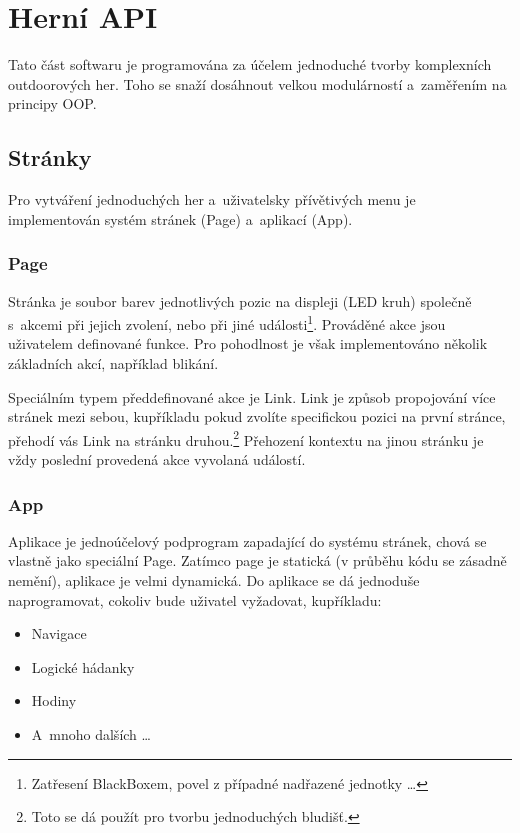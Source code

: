\chapter{Herní API}
Tato část softwaru je programována za účelem jednoduché tvorby komplexních outdoorových her.
Toho se snaží dosáhnout velkou modulárností a~zaměřením na principy OOP.

\section{Stránky}

Pro vytváření jednoduchých her a~uživatelsky přívětivých menu je implementován systém stránek (Page) a~aplikací (App).

\subsection{Page}

Stránka je soubor barev jednotlivých pozic na displeji (LED kruh) společně s~akcemi při jejich zvolení, nebo při jiné události\footnote{Zatřesení BlackBoxem, povel z případné nadřazené jednotky \dots}.
Prováděné akce jsou uživatelem definované funkce.
Pro pohodlnost je však implementováno několik základních akcí, například blikání.

Speciálním typem předdefinované akce je Link.
Link je způsob propojování více stránek mezi sebou, kupříkladu pokud zvolíte specifickou pozici na první stránce, přehodí vás Link na stránku druhou.\footnote{Toto se dá použít pro tvorbu jednoduchých bludišť.}
Přehození kontextu na jinou stránku je vždy poslední provedená akce vyvolaná událostí.

\subsection{App}

Aplikace je jednoúčelový podprogram zapadající do systému stránek, chová se vlastně jako speciální Page.
Zatímco page je statická (v průběhu kódu se zásadně nemění), aplikace je velmi dynamická.
Do aplikace se dá jednoduše naprogramovat, cokoliv bude uživatel vyžadovat, kupříkladu:
\begin{itemize}
    \item Navigace
    \item Logické hádanky
    \item Hodiny
    \item A~mnoho dalších \dots
\end{itemize}

